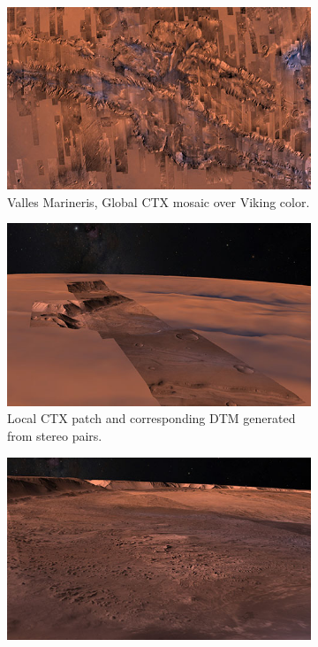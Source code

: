 \documentclass[journal]{vgtc}                %
\begin{document}
\iffalse{}

\begin{figure}
    \centering
    \begin{subfigure}[tb]{0.24\textwidth}
    	\includegraphics[width=\textwidth]{figures/valles_marineris3.jpg}
	\caption{Valles Marineris, Global CTX mosaic over Viking color.}
    \end{subfigure}
    \begin{subfigure}[tb]{0.24\textwidth}
    	\includegraphics[width=\textwidth]{figures/west_candor_chasma1.jpg}
	\caption{Local CTX patch and corresponding DTM generated from stereo pairs.}
    \end{subfigure}
    \begin{subfigure}[tb]{0.24\textwidth}
    	\includegraphics[width=\textwidth]{figures/west_candor_chasma2.jpg}

\end{subfigure}
\end{figure}
\end{document}
